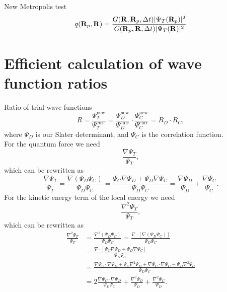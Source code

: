 New Metropolis test
\[
    q(\mathbf{R}_p, \mathbf{R}) = \frac{G(\mathbf{R}, \mathbf{R}_p, \Delta t) |\Psi_T(\mathbf{R}_p)|^2}{G(\mathbf{R}_p, \mathbf{R}, \Delta t) |\Psi_T(\mathbf{R})|^2}
\]

\section*{Efficient calculation of wave function ratios}
Ratio of trial wave functions
\[
    R = \frac{\Psi_T^\text{new}}{\Psi_T^\text{curr}} = \frac{\Psi_D^\text{new}}{\Psi_D^\text{curr}} \cdot \frac{\Psi_C^\text{new}}{\Psi_C^\text{curr}} = R_D\cdot R_C,
\]
where $\Psi_D$ is our Slater determinant, and $\Psi_C$ is the correlation function.\\

For the quantum force we need
\[
    \frac{\nabla \Psi_T}{\Psi_T},
\]
which can be rewritten as
\[
    \frac{\nabla \Psi_T}{\Psi_T} = \frac{\nabla(\Psi_D\Psi_C)}{\Psi_D\Psi_C} = \frac{\Psi_C\nabla\Psi_D + \Psi_D\nabla\Psi_C}{\Psi_D\Psi_C} = \frac{\nabla \Psi_D}{\Psi_D} + \frac{\nabla\Psi_C}{\Psi_C}.
\]
For the kinetic energy term of the local energy we need
\[
    \frac{\nabla^2\Psi_T}{\Psi_T},
\]
which can be rewritten as
\begin{align*}
    \frac{\nabla^2\Psi_T}{\Psi_T}
    &= \frac{\nabla^2(\Psi_D\Psi_C)}{\Psi_D\Psi_C} = \frac{\nabla\cdot[\nabla(\Psi_D\Psi_C)]}{\Psi_D\Psi_C} \\
    &= \frac{\nabla\cdot[\Psi_C\nabla\Psi_D + \Psi_D\nabla\Psi_C]}{\Psi_D\Psi_C} \\
    &= \frac{\nabla\Psi_C\cdot\nabla\Psi_D + \Psi_C\nabla^2\Psi_D + \nabla\Psi_C\cdot\nabla\Psi_C + \Psi_D\nabla^2\Psi_C}{\Psi_D\Psi_C} \\
    &= 2\frac{\nabla\Psi_C\cdot\nabla\Psi_D}{\Psi_D\Psi_C} + \frac{\nabla^2\Psi_D}{\Psi_D} + \frac{\nabla^2\Psi_C}{\Psi_D}
    .
\end{align*}

